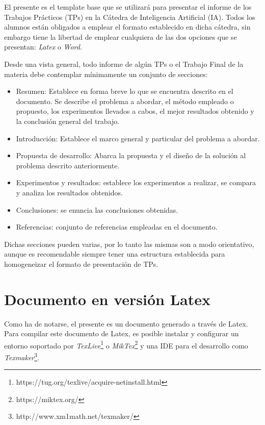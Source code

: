 \documentclass[1p,12pt]{elsarticle}
\begin{document}
El presente es el template base que se utilizará para presentar el informe de los Trabajos Prácticos (TPs) en la Cátedra de Inteligencia Artificial (IA). Todos los alumnos están obligados a emplear el formato establecido en dicha cátedra, sin embargo tiene la libertad de emplear cualquiera de las dos opciones que se presentan: \textit{Latex} o \textit{Word}.

Desde una vista general, todo informe de algún TPs o el Trabajo Final de la materia debe contemplar mínimamente un conjunto de secciones:

\begin{itemize}
	\item Resumen: Establece en forma breve lo que se encuentra descrito en el documento. Se describe el problema a abordar, el método empleado o propuesto, los experimentos llevados a cabos, el mejor resultados obtenido y la conclusión general del trabajo.
	\item Introducción: Establece el marco general y particular del problema a abordar.
	\item Propuesta de desarrollo: Abarca la propuesta y el diseño de la solución al problema descrito anteriormente.
	\item Experimentos y resultados: establece los experimentos a realizar, se compara y analiza los resultados obtenidos.
	\item Conclusiones: se enuncia las conclusiones obtenidas.
	\item Referencias: conjunto de referencias empleadas en el documento.
\end{itemize}

Dichas secciones pueden varias, por lo tanto las mismas son a modo orientativo, aunque es recomendable siempre tener una estructura establecida para homogeneizar el formato de presentación de TPs.

\section{Documento en versión Latex} %
\label{sec:documento_latex}

Como ha de notarse, el presente es un documento generado a través de Latex. Para compilar este documento de Latex, es posible instalar y configurar un entorno soportado por \textit{TexLive}\footnote{https://tug.org/texlive/acquire-netinstall.html} o \textit{MikTex}\footnote{https://miktex.org/} y una IDE para el desarrollo como \textit{Texmaker}\footnote{http://www.xm1math.net/texmaker/}.
\end{document}
